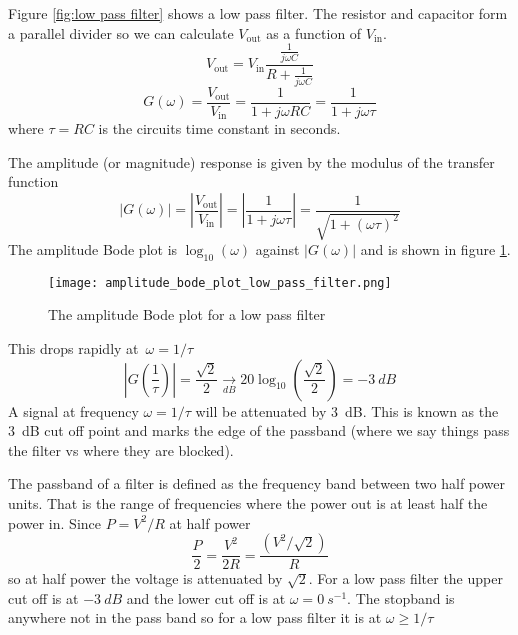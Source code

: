 \documentclass{article}
\begin{document}
    Figure \ref{fig:low pass filter} shows a low pass filter.
    The resistor and capacitor form a parallel divider so we can calculate \(V_\text{out}\) as a function of \(V_\text{in}\).
    \[V_\text{out} = V_\text{in}\frac{\frac{1}{j\omega C}}{R + \frac{1}{j\omega C}}\]
    \[G(\omega) = \frac{V_\text{out}}{V_\text{in}} = \frac{1}{1 + j\omega RC} = \frac{1}{1 + j\omega \tau}\]
    where \(\tau = RC\) is the circuits time constant in seconds.
    
    The amplitude (or magnitude) response is given by the modulus of the transfer function
    \[|G(\omega)| = \left |\frac{V_\text{out}}{V_\text{in}}\right | = \left |\frac{1}{1 + j\omega \tau}\right | = \frac{1}{\sqrt{1 + (\omega\tau)^2}}\]
    The amplitude Bode plot is \(\log_{10}(\omega)\) against \(|G(\omega)|\) and is shown in figure \ref{fig:bode amplitude plot LPF}.
    \begin{figure}[ht]
        \centering
        \texttt{[image: amplitude\_bode\_plot\_low\_pass\_filter.png]}
        \caption{The amplitude Bode plot for a low pass filter}
        \label{fig:bode amplitude plot LPF}
    \end{figure}
    This drops rapidly at~\(\omega = 1/\tau\)
    \[\left |G\left(\frac{1}{\tau}\right)\right | = \frac{\sqrt{2}}{2}\xrightarrow[\si{dB}]{} 20\log_{10}\left(\frac{\sqrt 2}{2}\right) = -\SI{3}{dB}\]
    A signal at frequency \(\omega = 1/\tau\) will be attenuated by \SI{3}{dB}.
    This is known as the \SI{3}{dB} cut off point and marks the edge of the passband (where we say things pass the filter vs where they are blocked).
    
    The passband of a filter is defined as the frequency band between two half power units.
    That is the range of frequencies where the power out is at least half the power in.
    Since \(P = V^2/R\) at half power
    \[\frac{P}{2} = \frac{V^2}{2R} = \frac{(V^2/\sqrt{2})}{R}\]
    so at half power the voltage is attenuated by \(\sqrt{2}\).
    For a low pass filter the upper cut off is at \(-\SI{3}{dB}\) and the lower cut off is at \(\omega = \SI{0}{s^{-1}}\).
    The stopband is anywhere not in the pass band so for a low pass filter it is at \(\omega \ge 1/\tau\)
    
\end{document}
